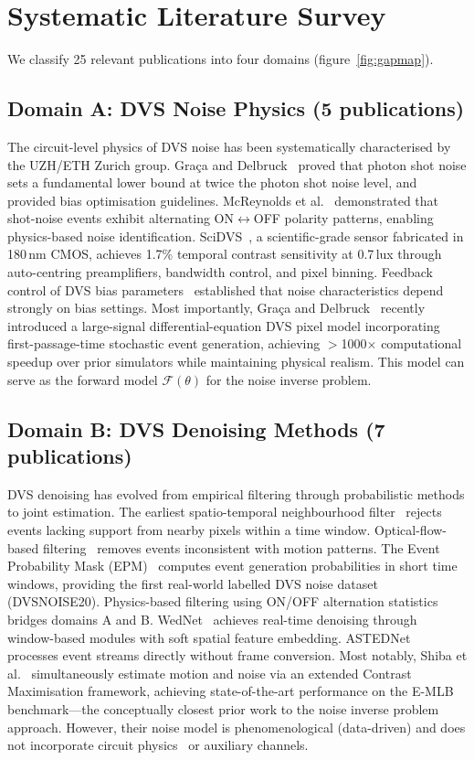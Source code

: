\documentclass[12pt]{article}
\begin{document}
\section{Systematic Literature Survey}
\label{sec:survey}

We classify 25 relevant publications into four domains (figure~\ref{fig:gapmap}).

\subsection{Domain A: DVS Noise Physics (5 publications)}

The circuit-level physics of DVS noise has been systematically characterised by the UZH/ETH Zurich group.
Gra\c{c}a and Delbruck~\cite{A1} proved that photon shot noise sets a fundamental lower bound at twice the photon shot noise level, and provided bias optimisation guidelines.
McReynolds et al.~\cite{A2} demonstrated that shot-noise events exhibit alternating ON$\leftrightarrow$OFF polarity patterns, enabling physics-based noise identification.
SciDVS~\cite{A3}, a scientific-grade sensor fabricated in 180\,nm CMOS, achieves 1.7\% temporal contrast sensitivity at 0.7\,lux through auto-centring preamplifiers, bandwidth control, and pixel binning.
Feedback control of DVS bias parameters~\cite{A4} established that noise characteristics depend strongly on bias settings.
Most importantly, Gra\c{c}a and Delbruck~\cite{A5} recently introduced a large-signal differential-equation DVS pixel model incorporating first-passage-time stochastic event generation, achieving $>$1000$\times$ computational speedup over prior simulators while maintaining physical realism.
This model can serve as the forward model $\mathcal{F}(\theta)$ for the noise inverse problem.

\subsection{Domain B: DVS Denoising Methods (7 publications)}

DVS denoising has evolved from empirical filtering through probabilistic methods to joint estimation.
The earliest spatio-temporal neighbourhood filter~\cite{B1} rejects events lacking support from nearby pixels within a time window.
Optical-flow-based filtering~\cite{B2} removes events inconsistent with motion patterns.
The Event Probability Mask (EPM)~\cite{B3} computes event generation probabilities in short time windows, providing the first real-world labelled DVS noise dataset (DVSNOISE20).
Physics-based filtering using ON/OFF alternation statistics~\cite{A2} bridges domains A and B.
WedNet~\cite{B5} achieves real-time denoising through window-based modules with soft spatial feature embedding.
ASTEDNet~\cite{B6} processes event streams directly without frame conversion.
Most notably, Shiba et al.~\cite{B7} simultaneously estimate motion and noise via an extended Contrast Maximisation framework, achieving state-of-the-art performance on the E-MLB benchmark---the conceptually closest prior work to the noise inverse problem approach.
However, their noise model is phenomenological (data-driven) and does not incorporate circuit physics~\cite{A5} or auxiliary channels.
\end{document}
